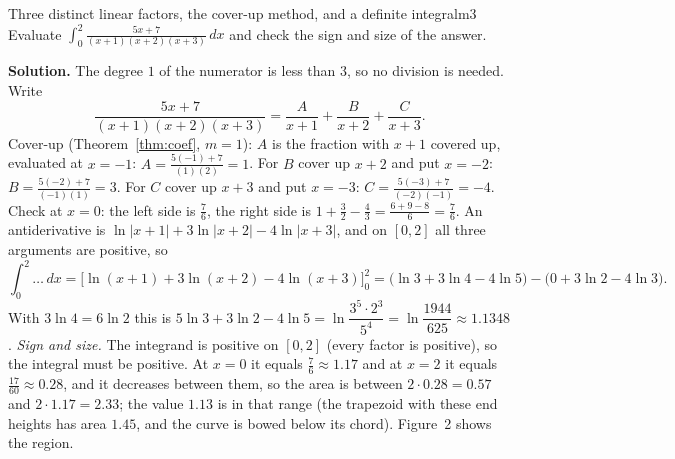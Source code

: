 \documentclass[11pt]{article}
\begin{document}
\begin{exmp}{Three distinct linear factors, the cover-up method, and a definite integral}{m3}
Evaluate $\displaystyle\int_0^2\frac{5x+7}{(x+1)(x+2)(x+3)}\,dx$ and check the sign and size of the answer.

\textbf{Solution.} The degree $1$ of the numerator is less than $3$, so no division is needed. Write
\[\frac{5x+7}{(x+1)(x+2)(x+3)}=\frac A{x+1}+\frac B{x+2}+\frac C{x+3}.\]
Cover-up (Theorem~\ref{thm:coef}, $m=1$): $A$ is the fraction with $x+1$ covered up, evaluated at $x=-1$: $A=\frac{5(-1)+7}{(1)(2)}=1$. For $B$ cover up $x+2$ and put $x=-2$: $B=\frac{5(-2)+7}{(-1)(1)}=3$. For $C$ cover up $x+3$ and put $x=-3$: $C=\frac{5(-3)+7}{(-2)(-1)}=-4$. Check at $x=0$: the left side is $\frac76$, the right side is $1+\frac32-\frac43=\frac{6+9-8}6=\frac76$. An antiderivative is $\ln\lvert x+1\rvert+3\ln\lvert x+2\rvert-4\ln\lvert x+3\rvert$, and on $[0,2]$ all three arguments are positive, so
\[\int_0^2\ldots\,dx=\Big[\ln(x+1)+3\ln(x+2)-4\ln(x+3)\Big]_0^2=\big(\ln3+3\ln4-4\ln5\big)-\big(0+3\ln2-4\ln3\big).\]
With $3\ln4=6\ln2$ this is $5\ln3+3\ln2-4\ln5=\ln\dfrac{3^5\cdot2^3}{5^4}=\ln\dfrac{1944}{625}\approx1.1348$.
\emph{Sign and size.} The integrand is positive on $[0,2]$ (every factor is positive), so the integral must be positive. At $x=0$ it equals $\frac76\approx1.17$ and at $x=2$ it equals $\frac{17}{60}\approx0.28$, and it decreases between them, so the area is between $2\cdot0.28=0.57$ and $2\cdot1.17=2.33$; the value $1.13$ is in that range (the trapezoid with these end heights has area $1.45$, and the curve is bowed below its chord). Figure~2 shows the region.


\end{exmp}
\end{document}
